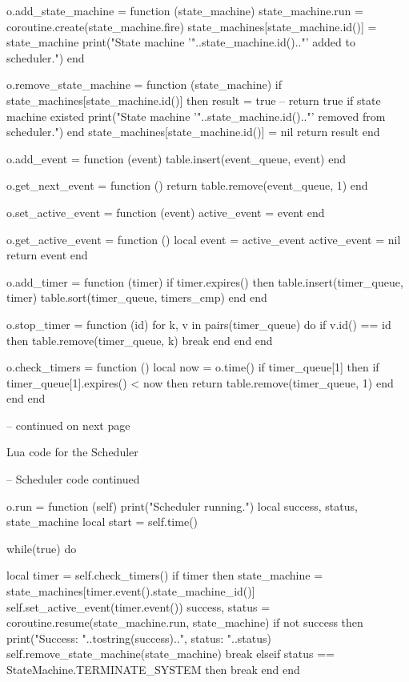 \begin{appendices}
\begin{listing}[H]
\begin{luacode}
	o.add_state_machine = function (state_machine)
		state_machine.run = coroutine.create(state_machine.fire)
		state_machines[state_machine.id()] = state_machine
		print("State machine '"..state_machine.id().."' added to scheduler.")
	end

	o.remove_state_machine = function (state_machine)
		if state_machines[state_machine.id()] then
			result = true -- return true if state machine existed
			print("State machine '"..state_machine.id().."' removed from scheduler.")
		end
		state_machines[state_machine.id()] = nil
		return result
	end

	o.add_event = function (event)
		table.insert(event_queue, event)
	end

	o.get_next_event = function ()
		return table.remove(event_queue, 1)
	end

	o.set_active_event = function (event)
		active_event = event
	end

	o.get_active_event = function ()
		local event = active_event
		active_event = nil
		return event
	end

	o.add_timer = function (timer)
		if timer.expires() then
			table.insert(timer_queue, timer)
			table.sort(timer_queue, timers_cmp)
		end
	end

	o.stop_timer = function (id)
		for k, v in pairs(timer_queue) do
			if v.id() == id then
				table.remove(timer_queue, k)
				break
			end
		end
	end

	o.check_timers = function ()
		local now = o.time()
		if timer_queue[1] then
			if timer_queue[1].expires() < now then return table.remove(timer_queue, 1) end
		end
	end

-- continued on next page
\end{luacode}
	\label{code:scheduler}
	\caption{Lua code for the Scheduler }
\end{listing}

\begin{listing}[H]
\begin{luacode}
-- Scheduler code continued

	o.run = function (self)
		print("Scheduler running.")
		local success, status, state_machine
		local start = self.time()

		while(true) do

			local timer = self.check_timers()
			if timer then
				state_machine = state_machines[timer.event().state_machine_id()]
				self.set_active_event(timer.event())
				success, status = coroutine.resume(state_machine.run, state_machine)
				if not success then
					print("Success: "..tostring(success)..", status: "..status)
					self.remove_state_machine(state_machine)
					break
				elseif status == StateMachine.TERMINATE_SYSTEM then
					break
				end
			end


\end{luacode}
\end{listing}
\end{appendices}
